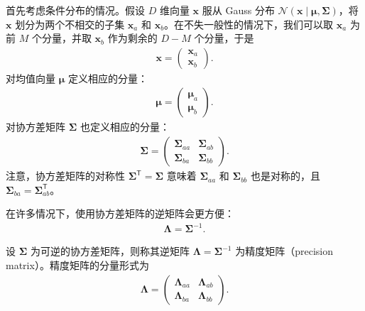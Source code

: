 \documentclass[../../main.tex]{subfiles}
\begin{document}
首先考虑条件分布的情况。假设 $D$ 维向量 $\boldsymbol{x}$ 服从 Gauss 分布 $\mathcal{N}(\boldsymbol{x}\mid\boldsymbol{\mu},\boldsymbol{\Sigma})$，将 $\boldsymbol{x}$ 划分为两个不相交的子集 $\boldsymbol{x}_{a}$ 和 $\boldsymbol{x}_{b}$。在不失一般性的情况下，我们可以取 $\boldsymbol{x}_{a}$ 为前 $M$ 个分量，并取 $\boldsymbol{x}_{b}$ 作为剩余的 $D-M$ 个分量，于是
\begin{align}
\boldsymbol{x}=\begin{pmatrix}\boldsymbol{x}_{a}\\ \boldsymbol{x}_{b}\end{pmatrix}.
\label{align:ch03-分块}
\end{align}
对均值向量 $\boldsymbol{\mu}$ 定义相应的分量：
\begin{align}
\boldsymbol{\mu}=\begin{pmatrix}\boldsymbol{\mu}_{a}\\ \boldsymbol{\mu}_{b}\end{pmatrix}.
\label{align:ch03-分块均值}
\end{align}
对协方差矩阵 $\boldsymbol{\Sigma}$ 也定义相应的分量：
\begin{align}
\boldsymbol{\Sigma}=\begin{pmatrix}\boldsymbol{\Sigma}_{aa} & \boldsymbol{\Sigma}_{ab}\\ \boldsymbol{\Sigma}_{ba} & \boldsymbol{\Sigma}_{bb}\end{pmatrix}.
\label{align:ch03-分块协方差}
\end{align}
注意，协方差矩阵的对称性 $\boldsymbol{\Sigma}^{\mathsf{T}}=\boldsymbol{\Sigma}$ 意味着 $\boldsymbol{\Sigma}_{aa}$ 和 $\boldsymbol{\Sigma}_{bb}$ 也是对称的，且 $\boldsymbol{\Sigma}_{ba}=\boldsymbol{\Sigma}_{ab}^{\mathsf{T}}$。

在许多情况下，使用协方差矩阵的逆矩阵会更方便：
\begin{align}
\boldsymbol{\Lambda}=\boldsymbol{\Sigma}^{-1}.
\label{align:ch03-精度矩阵}
\end{align}

\begin{definition}[精度矩阵]\label{definition:ch03-精度矩阵}
设 $\boldsymbol{\Sigma}$ 为可逆的协方差矩阵，则称其逆矩阵 $\boldsymbol{\Lambda}=\boldsymbol{\Sigma}^{-1}$ 为精度矩阵（precision matrix）。精度矩阵的分量形式为
\begin{align}
\boldsymbol{\Lambda}=\begin{pmatrix}\boldsymbol{\Lambda}_{aa} & \boldsymbol{\Lambda}_{ab}\\ \boldsymbol{\Lambda}_{ba} & \boldsymbol{\Lambda}_{bb}\end{pmatrix}.
\label{align:ch03-精度矩阵分块}
\end{align}
\end{definition}
\end{document}
